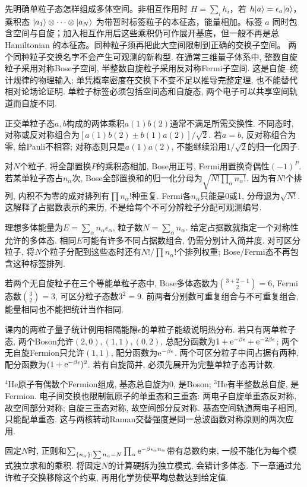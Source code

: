 \label{ch:states}
先明确单粒子态怎样组成多体空间。非相互作用时 $H=\sum_i h_i$，若 $h\lvert a\rangle=\epsilon_a\lvert a\rangle$，乘积态 $\lvert a_1\rangle\otimes\cdots\otimes\lvert a_N\rangle$ 为带暂时标签粒子的本征态，能量相加。标签 $a$ 同时包含空间与自旋；加入相互作用后这些乘积仍可作展开基底，但一般不再是总 Hamiltonian 的本征态。同种粒子须再把此大空间限制到正确的交换子空间。
两个同种粒子交换名字不会产生可观测的新构型. 在通常三维量子体系中, 整数自旋粒子采用对称Bose子空间, 半整数自旋粒子采用反对称Fermi子空间. 这是自旋--统计规律的物理输入; 单凭概率密度在交换下不变不足以推导完整定理, 也不能替代相对论场论证明. 单粒子标签必须包括空间态和自旋态, 两个电子可以共享空间轨道而自旋不同.

正交单粒子态$a,b$构成的两体乘积$a(1)b(2)$通常不满足所需交换性. 不同态时, 对称或反对称组合为$[a(1)b(2)\pm b(1)a(2)]/\sqrt2$. 若$a=b$, 反对称组合为零, 给Pauli不相容; 对称态则只是$a(1)a(2)$, 不能继续沿用$1/\sqrt2$的归一化因子.

对$N$个粒子, 将全部置换$P$的乘积态相加, Bose用正号, Fermi用置换奇偶性$(-1)^P$. 若某单粒子态占$n_\alpha$次, Bose全部置换和的归一化分母为$\sqrt{N!\prod_\alpha n_\alpha!}$. 因为有$N!$个排列, 内积不为零的成对排列有$\prod n_\alpha!$种重复. Fermi各$n_\alpha$只能是0或1, 分母退为$\sqrt{N!}$. 这解释了占据数表示的来历, 不是给每个不可分辨粒子分配可观测编号.

理想多体能量为$E=\sum_\alpha n_\alpha\epsilon_\alpha$, 粒子数$N=\sum_\alpha n_\alpha$. 给定占据数就指定一个对称性允许的多体态. 相同$E$可能有许多不同占据数组合, 仍需分别计入简并度. 对可区分粒子, 将$N$个粒子分配到这些态时还有$N!/\prod n_\alpha!$个排列权重; Bose/Fermi态不再包含这种标签排列.

若两个无自旋粒子在三个等能单粒子态中, Bose多体态数为$\binom{3+2-1}2=6$, Fermi态数$\binom32=3$, 可区分粒子态数$3^2=9$. 前两者分别数可重复组合与不可重复组合, 能量相同也不能把统计当作相同.

课内的两粒子量子统计例用相隔能隙$\epsilon$的单粒子能级说明热分布. 若只有两单粒子态, 两个Boson允许$(2,0),(1,1),(0,2)$, 总配分函数为$1+\mathrm e^{-\beta\epsilon}+\mathrm e^{-2\beta\epsilon}$; 两个无自旋Fermion只允许$(1,1)$, 配分函数为$\mathrm e^{-\beta\epsilon}$. 两个可区分粒子中间占据有两种, 配分函数为$(1+\mathrm e^{-\beta\epsilon})^2$. 若有自旋简并, 必须先展开为完整单粒子态再计数.

${}^4$He原子有偶数个Fermion组成, 基态总自旋为0, 是Boson; ${}^3$He有半整数总自旋, 是Fermion. 电子间交换也限制氦原子的单重态和三重态: 两电子自旋单重态反对称, 故空间部分对称; 自旋三重态对称, 故空间部分反对称. 基态空间轨道两电子相同, 只能配单重态. 这与两核转动Raman交替强度是同一总波函数对称原则的两次应用.

固定$N$时, 正则和$\sum_{\{n_\alpha\}:\sum n_\alpha=N}\prod_\alpha\mathrm e^{-\beta\epsilon_\alpha n_\alpha}$带有总数约束, 一般不能化为每个模式独立求和的乘积. 将固定$N$的计算硬拆为独立模式, 会错计多体态. 下一章通过允许粒子交换移除这个约束, 再用化学势使\textbf{平均}总数达到给定值.
